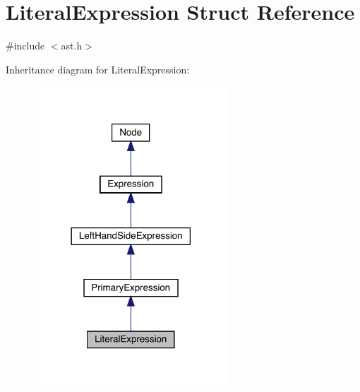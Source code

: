 \hypertarget{struct_literal_expression}{}\section{Literal\+Expression Struct Reference}
\label{struct_literal_expression}


{\ttfamily \#include $<$ast.\+h$>$}



Inheritance diagram for Literal\+Expression\+:
\nopagebreak
\begin{figure}[H]
\begin{center}
\leavevmode
\includegraphics[width=206pt]{struct_literal_expression__inherit__graph}
\end{center}
\end{figure}


